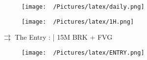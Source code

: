 \documentclass{article}
\begin{document}
\newpage

\centering
\begin{figure}[h!]
\begin{adjustbox}{width=1.1\textwidth,center}
  \texttt{[image: ~/Pictures/latex/daily.png]}
\end{adjustbox}
  \label{fig:image}
\end{figure}


\begin{figure}[h!]
  \begin{adjustbox}{width=1.1\textwidth,center}
  \texttt{[image: ~/Pictures/latex/1H.png]}
\end{adjustbox}
  \label{fig:image}
\end{figure}


\newpage


\( \rightrightarrows \) The Entry : |  15M BRK + FVG
\begin{figure}[h!]
  \begin{adjustbox}{width=1.2\textwidth,center}
  \texttt{[image: ~/Pictures/latex/ENTRY.png]}
\end{adjustbox}
\label{fig:image}
\end{figure}

\end{document}
